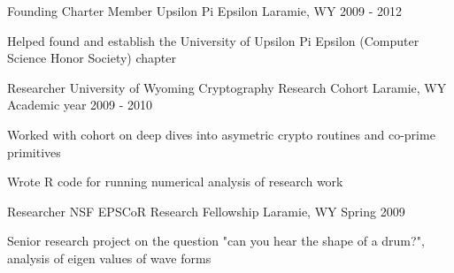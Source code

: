 \begin{cventries}
\cventry
{Founding Charter Member} %
{Upsilon Pi Epsilon} %
{Laramie, WY} %
{2009 - 2012} %
{ %
\begin{cvitems}
\item {Helped found and establish the University of Upsilon Pi Epsilon (Computer Science Honor Society) chapter}
\end{cvitems}
}


\cventry
{Researcher} %
{University of Wyoming Cryptography Research Cohort} %
{Laramie, WY} %
{Academic year 2009 - 2010} %
{ %
\begin{cvitems}
\item {Worked with cohort on deep dives into asymetric crypto routines and co-prime primitives}
\item {Wrote R code for running numerical analysis of research work}
\end{cvitems}
}


\cventry
{Researcher} %
{NSF EPSCoR Research Fellowship} %
{Laramie, WY} %
{Spring 2009} %
{ %
\begin{cvitems}
\item {Senior research project on the question "can you hear the shape of a drum?", analysis of eigen values of wave forms}
\end{cvitems}
}


\end{cventries}
